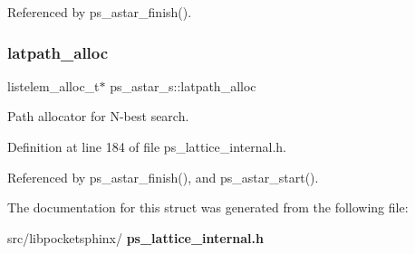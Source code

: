 Referenced by ps\+\_\+astar\+\_\+finish().

\mbox{\label{structps__astar__s_a754bce124cd92b1b2b6aa6dbbcd73cee}} 
\subsubsection{latpath\+\_\+alloc}
{\footnotesize\ttfamily listelem\+\_\+alloc\+\_\+t$\ast$ ps\+\_\+astar\+\_\+s\+::latpath\+\_\+alloc}



Path allocator for N-\/best search. 



Definition at line 184 of file ps\+\_\+lattice\+\_\+internal.\+h.



Referenced by ps\+\_\+astar\+\_\+finish(), and ps\+\_\+astar\+\_\+start().



The documentation for this struct was generated from the following file\+:\begin{DoxyCompactItemize}
\item 
src/libpocketsphinx/\textbf{ ps\+\_\+lattice\+\_\+internal.\+h}\end{DoxyCompactItemize}
